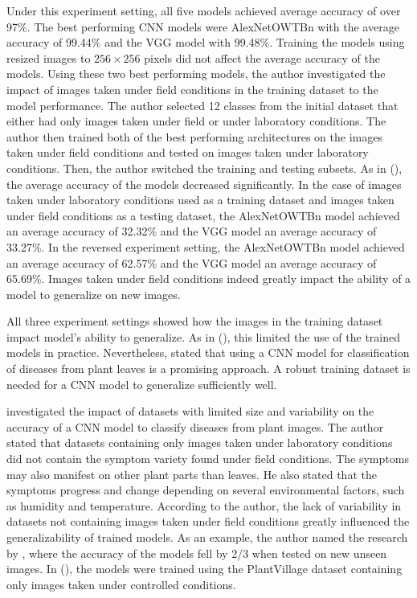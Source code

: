\documentclass{BachelorBUI}
\begin{document}
        Under this experiment setting, all five models achieved average accuracy of over 97\%. The best performing CNN models were AlexNetOWTBn with the average accuracy of 99.44\% and the VGG model with 99.48\%. Training the models using resized images to $256 \times 256$ pixels did not affect the average accuracy of the models. Using these two best performing models, the author investigated the impact of images taken under field conditions in the training dataset to the model performance. The author selected 12 classes from the initial dataset that either had only images taken under field or under laboratory conditions. The author then trained both of the best performing architectures on the images taken under field conditions and tested on images taken under laboratory conditions. Then, the author switched the training and testing subsets. As in (\cite{Mohanty:2016}), the average accuracy of the models decreased significantly. In the case of images taken under laboratory conditions used as a training dataset and images taken under field conditions as a testing dataset, the AlexNetOWTBn model achieved an average accuracy of 32.32\% and the VGG model an average accuracy of 33.27\%. In the reversed experiment setting, the AlexNetOWTBn model achieved an average accuracy of 62.57\% and the VGG model an average accuracy of 65.69\%. Images taken under field conditions indeed greatly impact the ability of a model to generalize on new images.

        All three experiment settings showed how the images in the training dataset impact model's ability to generalize. As in (\cite{Mohanty:2016}), this limited the use of the trained models in practice. Nevertheless, \textcite{Ferentinos:2018} stated that using a CNN model for classification of diseases from plant leaves is a promising approach. A robust training dataset is needed for a CNN model to generalize sufficiently well.


        \textcite{Barbedo:2018:1} investigated the impact of datasets with limited size and variability on the accuracy of a CNN model to classify diseases from plant images. The author stated that datasets containing only images taken under laboratory conditions did not contain the symptom variety found under field conditions. The symptoms may also manifest on other plant parts than leaves. He also stated that the symptoms progress and change depending on several environmental factors, such as humidity and temperature. According to the author, the lack of variability in datasets not containing images taken under field conditions greatly influenced the generalizability of trained models. As an example, the author named the research by \textcite{Mohanty:2016}, where the accuracy of the models fell by 2/3 when tested on new unseen images. In (\cite{Mohanty:2016}), the models were trained using the PlantVillage dataset containing only images taken under controlled conditions.
\end{document}
